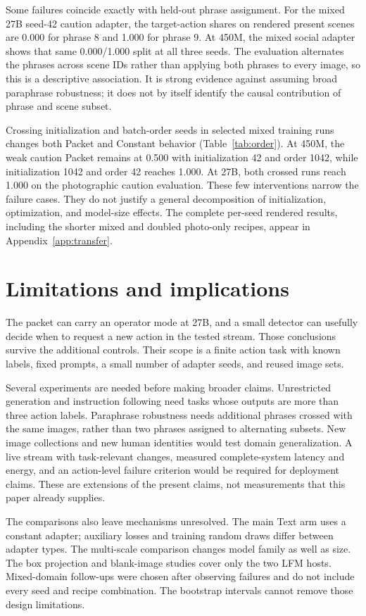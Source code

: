 \documentclass[10pt]{article}
\begin{document}
Some failures coincide exactly with held-out phrase assignment.
For the mixed 27B seed-42 caution adapter, the target-action shares
on rendered present scenes are 0.000 for phrase 8 and 1.000 for
phrase 9. At 450M, the mixed social adapter shows that same
0.000/1.000 split at all three seeds. The evaluation alternates
the phrases across scene IDs rather than applying both phrases
to every image, so this is a descriptive association. It is
strong evidence against assuming broad paraphrase robustness;
it does not by itself identify the causal contribution of
phrase and scene subset.

Crossing initialization and batch-order seeds in selected mixed
training runs changes both Packet and Constant behavior
(Table~\ref{tab:order}). At 450M, the weak caution Packet remains
at 0.500 with initialization 42 and order 1042, while initialization
1042 and order 42 reaches 1.000. At 27B, both crossed runs reach
1.000 on the photographic caution evaluation. These few
interventions narrow the failure cases. They do not justify a
general decomposition of initialization, optimization, and
model-size effects. The complete per-seed rendered results,
including the shorter mixed and doubled photo-only recipes,
appear in Appendix~\ref{app:transfer}.

\section{Limitations and implications}
The packet can carry an operator mode at 27B, and a small detector
can usefully decide when to request a new action in the tested
stream. Those conclusions survive the additional controls.
Their scope is a finite action task with known labels, fixed
prompts, a small number of adapter seeds, and reused image sets.

Several experiments are needed before making broader claims.
Unrestricted generation and instruction following need tasks
whose outputs are more than three action labels. Paraphrase
robustness needs additional phrases crossed with the same images,
rather than two phrases assigned to alternating subsets.
New image collections and new human identities would test
domain generalization. A live stream with task-relevant changes,
measured complete-system latency and energy, and an action-level
failure criterion would be required for deployment claims.
These are extensions of the present claims, not measurements
that this paper already supplies.

The comparisons also leave mechanisms unresolved. The main
Text arm uses a constant adapter; auxiliary losses and training
random draws differ between adapter types. The multi-scale
comparison changes model family as well as size. The box
projection and blank-image studies cover only the two LFM
hosts. Mixed-domain follow-ups were chosen after observing
failures and do not include every seed and recipe combination.
The bootstrap intervals cannot remove those design limitations.
\end{document}
